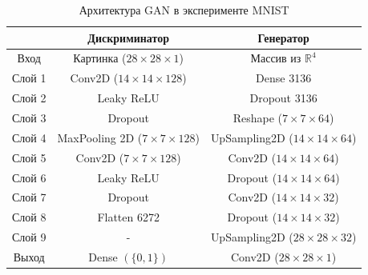 \documentclass[preprint,12pt]{elsarticle}
\begin{document}
\begin{table}[h]
    \centering
    \begin{tabular}{|c|c|c|}
\hline 
 & Дискриминатор & Генератор \\ 
\hline 
Вход & Картинка ($28 \times 28 \times 1$) & Массив из $\mathbb{R}^4$ \\
\hline 
Слой 1 & Conv2D ($14 \times 14 \times 128$) & Dense 3136\\ 
\hline 
Слой 2 & Leaky ReLU  & Dropout 3136 \\ 
\hline 
Слой 3 & Dropout & Reshape ($7 \times 7 \times 64$) \\
\hline
Слой 4 & MaxPooling 2D ($7 \times 7 \times 128$) & UpSampling2D ($14 \times 14 \times 64$) \\
\hline
Слой 5 & Conv2D ($7 \times 7 \times 128$) & Conv2D ($14 \times 14 \times 64$)\\
\hline
Слой 6 & Leaky ReLU & Dropout ($14 \times 14 \times 64$)\\
\hline
Слой 7 &Dropout & Conv2D ($14 \times 14 \times 32$)\\
\hline
Слой 8 & Flatten 6272& Dropout ($14 \times 14 \times 32$) \\
\hline
Слой 9 & -& UpSampling2D ($28 \times 28 \times 32$) \\
\hline
Выход & Dense $ \left( \{0,1\} \right)$ & Conv2D ($28 \times 28 \times 1$) \\
\hline
\end{tabular}
    \caption{Архитектура GAN в эксперименте MNIST}
    \label{tab:my_label}
\end{table}
\end{document}
